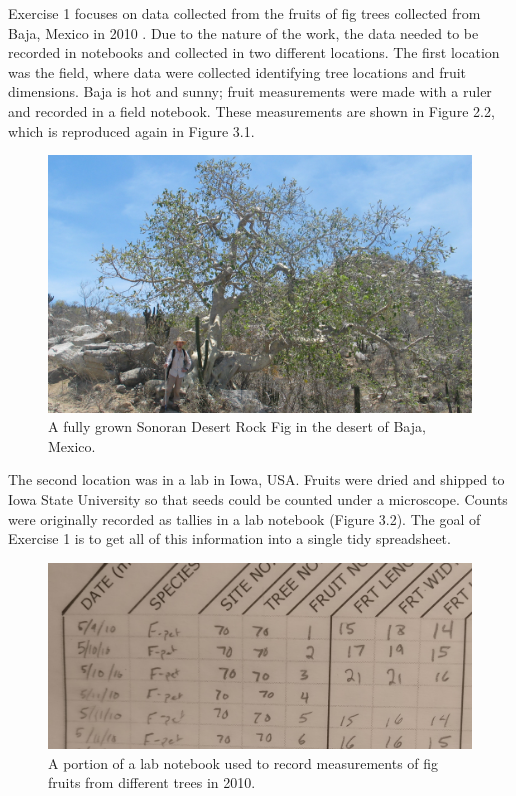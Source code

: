 \documentclass[
]{scrbook}
\begin{document}
Exercise 1 focuses on data collected from the fruits of fig trees collected from Baja, Mexico in 2010 \citep{Duthie2015b, Duthie2016}.
Due to the nature of the work, the data needed to be recorded in notebooks and collected in two different locations.
The first location was the field, where data were collected identifying tree locations and fruit dimensions.
Baja is hot and sunny; fruit measurements were made with a ruler and recorded in a field notebook.
These measurements are shown in Figure 2.2, which is reproduced again in Figure 3.1.

\begin{figure}
\includegraphics[width=1\linewidth]{img/Ficus_petiolaris} \caption{A fully grown Sonoran Desert Rock Fig in the desert of Baja, Mexico.}\label{fig:unnamed-chunk-8}
\end{figure}

The second location was in a lab in Iowa, USA.
Fruits were dried and shipped to Iowa State University so that seeds could be counted under a microscope.
Counts were originally recorded as tallies in a lab notebook (Figure 3.2).
The goal of Exercise 1 is to get all of this information into a single tidy spreadsheet.

\begin{figure}
\includegraphics[width=1\linewidth]{img/handwritten_data} \caption{A portion of a lab notebook used to record measurements of fig fruits from different trees in 2010.}\label{fig:unnamed-chunk-9}
\end{figure}
\end{document}
